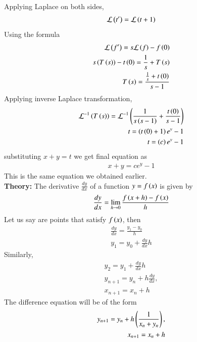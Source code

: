 \documentclass[journal]{IEEEtran}
\begin{document}
Applying Laplace on both sides,
\begin{align}
\mathcal{L}\left(t^\prime\right)=\mathcal{L}\left(t+1\right)
\end{align}
Using the formula 
\begin{align}
\mathcal{L}\left(f^\prime\right)=s\mathcal{L}\left(f\right)-f\left(0\right)\\
s\left(T\left(s\right)\right)-t\left(0\right)=\frac{1}{s}+T\left(s\right)\\
T\left(s\right)=\frac{\frac{1}{s}+t\left(0\right)}{s-1}
\end{align}
Applying inverse Laplace transformation,
\begin{align}
\mathcal{L}^{-1}\left(T\left(s\right)\right)=\mathcal{L}^{-1}\left(\frac{1}{s\left(s-1\right)}+\frac{t\left(0\right)}{s-1}\right)\\
t=\left(t\left(0\right)+1\right)e^y -1\\
t=\left(c\right)e^y-1
\end{align}
substituting $x+y=t$ we get final equation as
\begin{align}
x+y=ce^y-1
\end{align}
This is the same equation we obtained earlier.\\
\textbf{Theory:}
The derivative $\frac{dy}{dx}$ of a function $y=f\left(x\right)$ is given by
\begin{align}
\frac{dy}{dx}=\lim_{h \to 0} \frac{f\left(x+h\right)-f\left(x\right)}{h}
\end{align}
Let us say  are points that satisfy $f\left(x\right)$, then 
\begin{align}
 \frac{dy}{dx}=\frac{y_1-y_0}{h}\\
  y_1=y_0+\frac{dy}{dx}h
\end{align}
Similarly,
\begin{align}
y_2=y_1+\frac{dy}{dx}h\\
y_{n+1}=y_n+h\frac{dy}{dx},\\
x_{n+1}=x_n+h
\end{align}
The difference equation will be of the form
\begin{align}
y_{n+1}=y_n+h\left(\frac{1}{x_n+y_n}\right),\\
x_{n+1}=x_n+h
\end{align}
\end{document}

